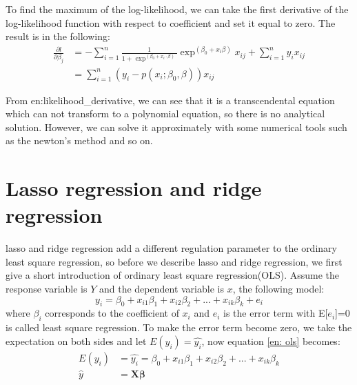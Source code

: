 To find the maximum of the log-likelihood,  we can take the first derivative of the log-likelihood function with respect to coefficient and set it equal to zero. The result is in the following: \\
\begin{equation}\label{en:likelihood_derivative}
\begin{aligned}
\frac{\partial l }{\partial \beta_j}&=-\sum_{i=1}^{n}\frac{1}{1+\exp^{(\beta_0+x_i\cdot \beta)}}\exp^{(\beta_0+x_i\beta)}x_{ij}
+\sum_{i=1}^{n}y_ix_{ij}\\
&=\sum_{i=1}^{n}(y_i-p(x_i;\beta_0, \beta))x_{ij}
\end{aligned}
\end{equation}

From {en:likelihood_derivative},  we can see that it is a transcendental equation which can not transform to a polynomial equation,  so there is no analytical solution. However, we can solve it approximately with some numerical tools such as the newton's method and so on.   

\section{Lasso regression and ridge regression}
lasso and ridge regression add a different regulation parameter to the ordinary least square regression,  so before we describe lasso and ridge regression,  we first give a short introduction of ordinary least square regression(OLS). Assume the response variable is $Y$ and the dependent variable is $x$,  the following model:  \\
\begin{equation}\label{en: ols}
y_i=\beta_0+x_{i1}\beta_1 +x_{i2}\beta_2+...+ x_{ik}\beta_k+e_i
\end{equation}
where $\beta_i$ corresponds to the coefficient of $x_i$ and $e_i$ is the error term with E[$e_i$]=0\\
is called least square regression. To make the error term become zero,  we take the expectation on both sides and let $E(y_i)=\hat{y_i}$,  now equation \ref{en: ols} becomes: 
\begin{equation}
\begin{aligned}
E(y_i) &=\hat{y_i}=\beta_0+x_{i1}\beta_1 +x_{i2}\beta_2+...+ x_{ik}\beta_k\\
\hat{y} &={\bm{X\beta}}
\end{aligned}
\end{equation}

